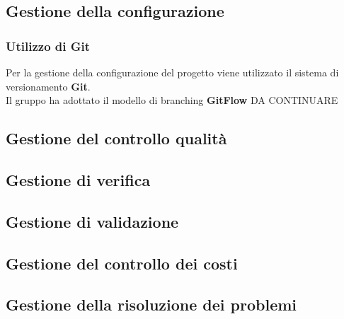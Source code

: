     \subsection{Gestione della configurazione}

        \subsubsection{Utilizzo di Git}
        Per la gestione della configurazione del progetto viene utilizzato il sistema di versionamento \textbf{Git}.\\
        Il gruppo ha adottato il modello di branching \textbf{GitFlow} DA CONTINUARE

    \subsection{Gestione del controllo qualità}
    \subsection{Gestione di verifica}
    \subsection{Gestione di validazione}
    \subsection{Gestione del controllo dei costi}
    \subsection{Gestione della risoluzione dei problemi}

